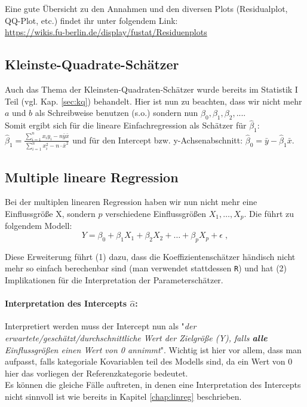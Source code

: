 \documentclass[a4paper]{article}
\newcommand\dangersign[1][2ex]{%
  \renewcommand\stacktype{L}%
  \scaleto{\stackon[1.3pt]{\color{red}$\triangle$}{\tiny !}}{#1}%
}
\begin{document}
Eine gute Übersicht zu den Annahmen und den diversen Plots (Residualplot, QQ-Plot, etc.) findet ihr unter folgendem Link:\\
\url{https://wikis.fu-berlin.de/display/fustat/Residuenplots}

\subsection{Kleinste-Quadrate-Schätzer}
Auch das Thema der Kleinsten-Quadraten-Schätzer wurde bereits im Statistik I Teil (vgl. Kap. \ref{sec:kq}) behandelt. Hier ist nun zu beachten, dass wir nicht mehr $a$ und $b$ als Schreibweise benutzen (s.o.) sondern nun $\beta_0, \beta_1, \beta_2,....$\\
Somit ergibt sich für die lineare Einfachregression als Schätzer für $\hat{\beta}_1$: $\hat{\beta}_1=\frac{\sum_{i=1}^n x_iy_i-n\bar y\bar x}{\sum_{i=1}^n x^2_i-n\cdot \bar x^2}$ und für den Intercept bzw. y-Achsenabschnitt: $\hat\beta_0=\bar y-\hat\beta_1\bar x$.

\subsection{Multiple lineare Regression}\label{sec:mult-reg}
Bei der multiplen linearen Regression haben wir nun nicht mehr eine Einflussgröße X, sondern $p$ verschiedene Einflussgrößen $X_1, \hdots, X_p$. Die führt zu folgendem Modell:
$$Y = \beta_0 + \beta_1 X_1 + \beta_2 X_2 + \hdots + \beta_p X_p + \epsilon\;,$$ 

\noindent Diese Erweiterung führt (1) dazu, dass die Koeffizientenschätzer händisch nicht mehr so einfach berechenbar sind (man verwendet stattdessen \texttt{R}) und hat (2) Implikationen für die Interpretation der Parameterschätzer.

\paragraph{Interpretation des Intercepts $\hat \alpha$:} Interpretiert werden muss der Intercept nun als "\textit{der erwartete/geschätzt/durchschnittliche Wert der Zielgröße (Y), falls \textbf{alle} Einflussgrößen einen Wert von 0 annimmt}". Wichtig ist hier vor allem, dass man aufpasst, falls kategoriale Kovariablen teil des Modells sind, da ein Wert von 0 hier das vorliegen der Referenzkategorie bedeutet.\\

\noindent \dangersign[3ex] Es können die gleiche Fälle auftreten, in denen eine Interpretation des Intercepts nicht sinnvoll ist wie bereits in Kapitel \ref{chap:linreg} beschrieben.
\end{document}
